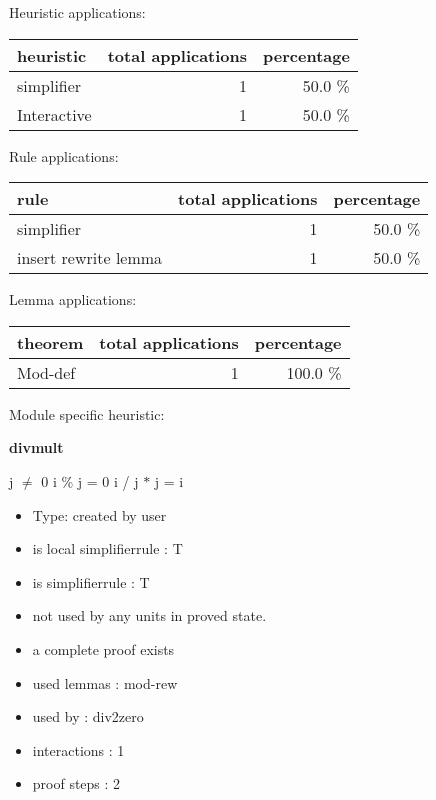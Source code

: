 \documentclass[a4paper]{article}
\begin{document}
\medskip


Heuristic applications:

\begin{supertabular}{l|r|r}
heuristic	& total applications & percentage \\ \hline
simplifier & 1 & 50.0 \% \\
Interactive & 1 & 50.0 \% \\

\end{supertabular}

Rule applications:

\begin{supertabular}{l|r|r}
rule	        & total applications & percentage \\ \hline
simplifier & 1 & 50.0 \% \\
insert rewrite lemma & 1 & 50.0 \% \\

\end{supertabular}

Lemma applications:

\begin{supertabular}{l|r|r}
theorem	        & total applications & percentage \\ \hline
Mod-def & 1 & 100.0 \% \\

\end{supertabular}

Module specific heuristic:

\pagebreak

{\LARGE\bf divmult}\label{lemma-divmult}

\medskip

j $\neq$ 0 \Fol i \% j = 0 \Imp i / j $*$ j = i

\begin{itemize}

\item Type: created by user

\item is local simplifierrule : T
\item is simplifierrule : T
\item not used by any units in proved state.
\item       a complete proof exists
\item       used lemmas  : mod-rew
\item       used by      : div2zero
\item       interactions : 1
\item       proof steps  : 2
\end{itemize}
\end{document}
